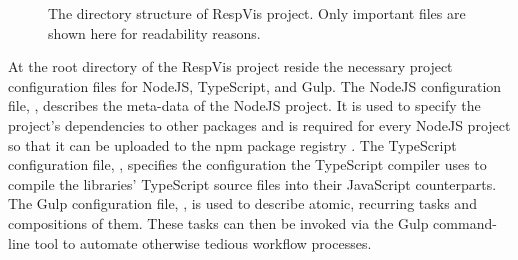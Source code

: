\begin{figure}[tp]
\centering
{}
\caption[RespVis Directory Structure]{
  The directory structure of RespVis project. 
  Only important files are shown here for readability reasons.
}
\label{fig:RespVisDirTree}
\end{figure}

At the root directory of the RespVis project reside the necessary
project configuration files for NodeJS, TypeScript, and Gulp.  The
NodeJS configuration file, , describes the
meta-data of the NodeJS project.  It is used to specify the project's
dependencies to other packages and is required for every NodeJS
project so that it can be uploaded to the npm package registry
\parencite{npm}.  The TypeScript configuration file,
, specifies the configuration the TypeScript
compiler uses to compile the libraries' TypeScript source files into
their JavaScript counterparts.  The Gulp configuration file,
, is used to describe atomic, recurring tasks and
compositions of them.  These tasks can then be invoked via the Gulp
command-line tool to automate otherwise tedious workflow processes.

